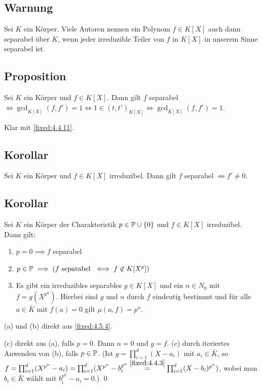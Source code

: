 \subsection{Warnung} Sei $K$ ein Körper. Viele Autoren nennen ein Polynom $f \in K[X]$ auch dann separabel über $K$, wenn jeder irreduzible Teiler von $f$ in $K[X]$ in unserem Sinne separabel ist.

\subsection{Proposition} Sei $K$ ein Körper und $f \in K[X]$. Dann gilt $f$ separabel $\iff \gcd_{K[X]}(f,f')=1 \iff 1 \in (t,t')_{K[X]} \iff \gcd_{\bar K[X]} (f,f')=1$.

\proof Klar mit \ref{fixed:4.4.11}.

\subsection{Korollar} Sei $K$ ein Körper und $f \in K[X]$ irreduzibel. Dann gilt $f$ separabel $\iff f' \neq 0$.

\subsection{Korollar} Sei $K$ ein Körper der Charakteristik $p \in \P \cup \{0\}$ und $f \in K[X]$ irreduzibel. Dann gilt:
\begin{enumerate}[label=(\alph*)]
	\item
		$p = 0 \implies f$ separabel
		
	\item
		$p \in \P \implies (f \text{ separabel } \iff f \not\in K[X^p])$
		
	\item
		Es gibt ein irreduzibles separables $g \in K[X]$ und ein $n \in N_0$ mit $f = g(X^{p^n})$. Hierbei sind $g$ und $n$ durch $f$ eindeutig bestimmt und für alle $a \in \bar K$ mit $f(a)=0$ gilt $\mu(a,f) = p^n$.
\end{enumerate}

\proof (a) und (b) direkt aus \ref{fixed:4.5.4}.

(c) direkt aus (a), falls $p=0$. Dann $n=0$ und $g=f$. (c) durch iteriertes Anwenden von (b), falls $p \in \P$. (Ist $g = \prod_{i=1}^d (X-a_i)$ mit $a_i \in \bar K$, so $f = \prod_{i=1}^d (X^{p^n}-a_i) = \prod_{i=1}^d (X^{p^n} - b_i^{p^n} \overset{\ref{fixed:4.4.3}}{=} \prod_{i=1}^d (X-b_i)^{p^n})$, wobei man $b_i \in \bar K$ wählt mit $b_i^{p^n} - a_i = 0$.) \qed